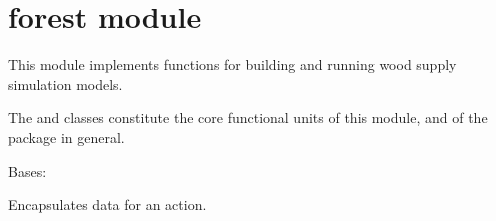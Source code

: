 \documentclass[letterpaper,10pt,english]{sphinxmanual}
\begin{document}
\section{forest module}
\label{\detokenize{forest:forest-module}}\label{\detokenize{forest::doc}}\label{\detokenize{forest:module-forest}}
This module implements functions for building and running wood supply simulation
models.

The  and  classes constitute the core functional units of this module, and of the  package in general.

\begin{fulllineitems}
\label{\detokenize{forest:forest.Action}}
Bases: 

Encapsulates data for an action.

\end{fulllineitems}

\end{document}
